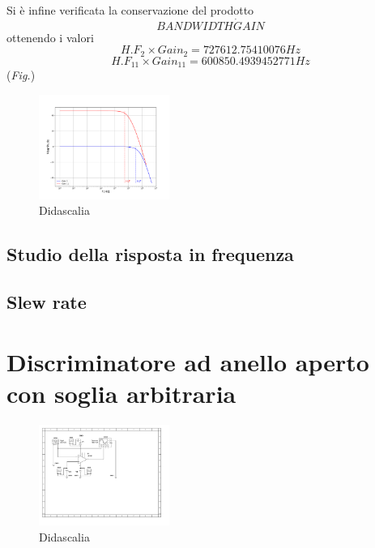 \documentclass[journal]{IEEEtran}
\begin{document}
Si è infine verificata la conservazione del prodotto 
\[BAND WIDTH \dot GAIN\]
ottenendo i valori \[H.F_{2}\times Gain_2 = 727612.75410076 Hz\]  \[H.F_{11}\times Gain_{11} = 600850.4939452771 Hz\] (\textit{Fig.})
\begin{figure}[H]%
\begin {center}
\includegraphics[width=0.38\textwidth]{analysis/output/OPA-bode_gain_comparison(mag).pdf}
\caption{Didascalia}
\label{fig:oscilloscope}
\end {center}
\end{figure}




\subsection{Studio della risposta in frequenza}

\subsection{Slew rate}

\section{Discriminatore ad anello aperto con soglia arbitraria} %

\begin{figure}[H]%
\begin {center}
\includegraphics[width=0.38\textwidth]{sch-simulations/output/OPA-biased.pdf}
\caption{Didascalia}
\label{fig:oscilloscope}
\end {center}
\end{figure}
\end{document}
